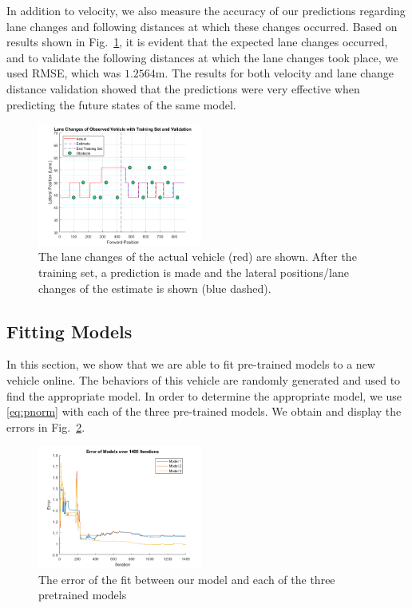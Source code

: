 \documentclass[letterpaper, 10 pt, conference]{ieeeconf}  %
\begin{document}
In addition to velocity, we also measure the accuracy of our predictions regarding lane changes and following distances at which these changes occurred. Based on results shown in Fig.~\ref{fig:train2}, it is evident that the expected lane changes occurred, and to validate the following distances at which the lane changes took place, we used RMSE, which was $1.2564$m. The results for both velocity and lane change distance validation showed that the predictions were very effective when predicting the future states of the same model.

\begin{figure}[ht]
\includegraphics[width=0.48\textwidth]{fig/train2.png}
\caption{The lane changes of the actual vehicle (red) are shown. After the training set, a prediction is made and the lateral positions/lane changes of the estimate is shown (blue dashed).} \label{fig:train2}
\end{figure}




\subsection{Fitting Models}

In this section, we show that we are able to fit pre-trained models to a new vehicle online. The behaviors of this vehicle are randomly generated and used to find the appropriate model. In order to determine the appropriate model, we use \eqref{eq:pnorm} with each of the three pre-trained models. We obtain and display the errors in Fig.~\ref{fig:error}.

\begin{figure}[ht]
    \includegraphics[width=0.48\textwidth]{fig/modelerror.png}
    \caption{The error of the fit between our model and each of the three pretrained models} \label{fig:error}
\end{figure}
\end{document}
